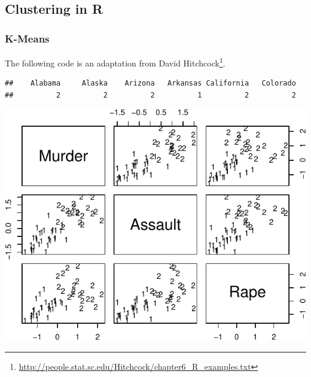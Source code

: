 \documentclass[]{book}
\newenvironment{Shaded}{\begin{snugshade}}{\end{snugshade}}
\newcommand{\CommentTok}[1]{\textcolor[rgb]{0.56,0.35,0.01}{\textit{#1}}}
\newcommand{\ControlFlowTok}[1]{\textcolor[rgb]{0.13,0.29,0.53}{\textbf{#1}}}
\newcommand{\DataTypeTok}[1]{\textcolor[rgb]{0.13,0.29,0.53}{#1}}
\newcommand{\DecValTok}[1]{\textcolor[rgb]{0.00,0.00,0.81}{#1}}
\newcommand{\FloatTok}[1]{\textcolor[rgb]{0.00,0.00,0.81}{#1}}
\newcommand{\KeywordTok}[1]{\textcolor[rgb]{0.13,0.29,0.53}{\textbf{#1}}}
\newcommand{\NormalTok}[1]{#1}
\newcommand{\OperatorTok}[1]{\textcolor[rgb]{0.81,0.36,0.00}{\textbf{#1}}}
\newcommand{\StringTok}[1]{\textcolor[rgb]{0.31,0.60,0.02}{#1}}
\renewcommand{\href}[2]{#2\footnote{\url{#1}}}
\theoremstyle{definition}
\theoremstyle{definition}
\theoremstyle{definition}
\theoremstyle{remark}
\begin{document}
\hypertarget{clustering-in-r}{%
\subsection{Clustering in R}\label{clustering-in-r}}

\hypertarget{k-means-2}{%
\subsubsection{K-Means}\label{k-means-2}}

The following code is an adaptation from \href{http://people.stat.sc.edu/Hitchcock/chapter6_R_examples.txt}{David Hitchcock}.

\begin{Shaded}
\end{Shaded}

\begin{verbatim}
##    Alabama     Alaska    Arizona   Arkansas California   Colorado 
##          2          2          2          1          2          2
\end{verbatim}

\begin{Shaded}
\end{Shaded}

\includegraphics[width=0.5\linewidth]{Rcourse_files/figure-latex/kmeans-1}
\end{document}
